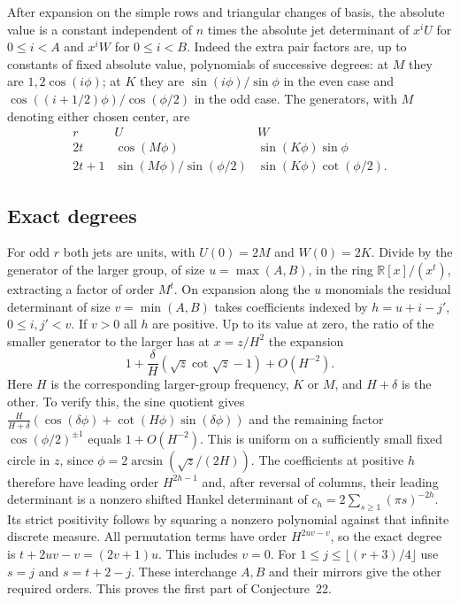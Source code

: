 \documentclass[11pt,a4paper]{article}
\begin{document}
After expansion on the simple rows and triangular changes of basis, the absolute value is a constant independent of $n$ times the absolute jet determinant of $x^i U$ for $0\le i<A$ and $x^i W$ for $0\le i<B$. Indeed the extra pair factors are, up to constants of fixed absolute value, polynomials of successive degrees: at $M$ they are $1,2\cos(i\phi)$; at $K$ they are $\sin(i\phi)/\sin\phi$ in the even case and $\cos((i+1/2)\phi)/\cos(\phi/2)$ in the odd case. The generators, with $M$ denoting either chosen center, are
\[
\begin{array}{c|cc}
 r&U&W\\ \hline
 2t&\cos(M\phi)&\sin(K\phi)\sin\phi\\
 2t+1&\sin(M\phi)/\sin(\phi/2)&\sin(K\phi)\cot(\phi/2).
\end{array}
\]

\subsection*{Exact degrees}
For odd $r$ both jets are units, with $U(0)=2M$ and $W(0)=2K$. Divide by the generator of the larger group, of size $u=\max(A,B)$, in the ring $\mathbb R[x]/(x^t)$, extracting a factor of order $M^t$. On expansion along the $u$ monomials the residual determinant of size $v=\min(A,B)$ takes coefficients indexed by $h=u+i-j'$, $0\le i,j'<v$. If $v>0$ all $h$ are positive. Up to its value at zero, the ratio of the smaller generator to the larger has at $x=z/H^2$ the expansion
\[
 1+\frac{\delta}{H}(\sqrt z\cot\sqrt z-1)+O(H^{-2}).
\]
Here $H$ is the corresponding larger-group frequency, $K$ or $M$, and $H+\delta$ is the other. To verify this, the sine quotient gives
$\frac{H}{H+\delta}(\cos(\delta\phi)+\cot(H\phi)\sin(\delta\phi))$
and the remaining factor $\cos(\phi/2)^{\pm1}$ equals $1+O(H^{-2})$. This is uniform on a sufficiently small fixed circle in $z$, since
$\phi=2\arcsin(\sqrt z/(2H))$. The coefficients at positive $h$ therefore have leading order $H^{2h-1}$ and, after reversal of columns, their leading determinant is a nonzero shifted Hankel determinant of $c_h=2\sum_{s\ge1}(\pi s)^{-2h}$. Its strict positivity follows by squaring a nonzero polynomial against that infinite discrete measure. All permutation terms have order $H^{2uv-v}$, so the exact degree is $t+2uv-v=(2v+1)u$. This includes $v=0$. For $1\le j\le\lfloor(r+3)/4\rfloor$ use $s=j$ and $s=t+2-j$. These interchange $A,B$ and their mirrors give the other required orders. This proves the first part of Conjecture~22.
\end{document}
